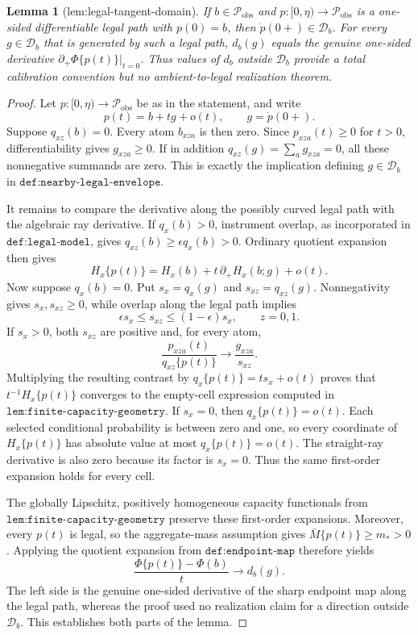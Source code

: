 \documentclass{article}
\newtheorem{lemma}{Lemma}
\begin{document}
\begin{lemma}[lem:legal-tangent-domain]\label{lem:legal-tangent-domain}
If \(b\in\mathcal P_{\mathrm{obs}}\) and \(p:[0,\eta)\to\mathcal P_{\mathrm{obs}}\) is a one-sided differentiable legal path with \(p(0)=b\), then \(\dot p(0+)\in\mathcal D_b\). For every \(g\in\mathcal D_b\) that is generated by such a legal path, \(d_b(g)\) equals the genuine one-sided derivative \(\partial_+\Phi\{p(t)\}|_{t=0}\). Thus values of \(d_b\) outside \(\mathcal D_b\) provide a total calibration convention but no ambient-to-legal realization theorem.
\end{lemma}
\begin{proof}
Let \(p:[0,\eta)\to\mathcal P_{\mathrm{obs}}\) be as in the statement, and write
\[
p(t)=b+t g+o(t),\qquad g=\dot p(0+).
\]
Suppose \(q_{xz}(b)=0\).  Every atom \(b_{xza}\) is then zero.  Since \(p_{xza}(t)\ge0\) for \(t>0\), differentiability gives \(g_{xza}\ge0\).  If in addition \(q_{xz}(g)=\sum_a g_{xza}=0\), all these nonnegative summands are zero.  This is exactly the implication defining \(g\in\mathcal D_b\) in \(\texttt{def:nearby-legal-envelope}\).

It remains to compare the derivative along the possibly curved legal path with the algebraic ray derivative.  If \(q_x(b)>0\), instrument overlap, as incorporated in \(\texttt{def:legal-model}\), gives \(q_{xz}(b)\ge\epsilon q_x(b)>0\).  Ordinary quotient expansion then gives
\[
H_x\{p(t)\}=H_x(b)+t\,\partial_+H_x(b;g)+o(t).
\]
Now suppose \(q_x(b)=0\).  Put \(s_x=q_x(g)\) and \(s_{xz}=q_{xz}(g)\).  Nonnegativity gives \(s_x,s_{xz}\ge0\), while overlap along the legal path implies
\[
\epsilon s_x\le s_{xz}\le(1-\epsilon)s_x,
\qquad z=0,1.
\]
If \(s_x>0\), both \(s_{xz}\) are positive and, for every atom,
\[
\frac{p_{xza}(t)}{q_{xz}\{p(t)\}}\longrightarrow \frac{g_{xza}}{s_{xz}}.
\]
Multiplying the resulting contrast by \(q_x\{p(t)\}=ts_x+o(t)\) proves that \(t^{-1}H_x\{p(t)\}\) converges to the empty-cell expression computed in \(\texttt{lem:finite-capacity-geometry}\).  If \(s_x=0\), then \(q_x\{p(t)\}=o(t)\).  Each selected conditional probability is between zero and one, so every coordinate of \(H_x\{p(t)\}\) has absolute value at most \(q_x\{p(t)\}=o(t)\).  The straight-ray derivative is also zero because its factor is \(s_x=0\).  Thus the same first-order expansion holds for every cell.

The globally Lipschitz, positively homogeneous capacity functionals from \(\texttt{lem:finite-capacity-geometry}\) preserve these first-order expansions.  Moreover, every \(p(t)\) is legal, so the aggregate-mass assumption gives \(\bar M\{p(t)\}\ge m_*>0\).  Applying the quotient expansion from \(\texttt{def:endpoint-map}\) therefore yields
\[
\frac{\Phi\{p(t)\}-\Phi(b)}{t}\longrightarrow d_b(g).
\]
The left side is the genuine one-sided derivative of the sharp endpoint map along the legal path, whereas the proof used no realization claim for a direction outside \(\mathcal D_b\).  This establishes both parts of the lemma.
\end{proof}
\end{document}
